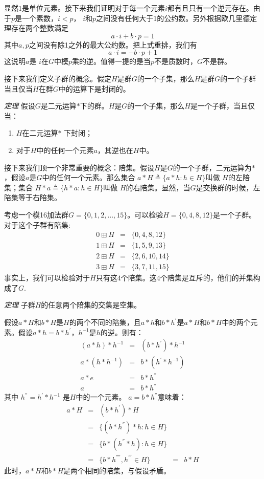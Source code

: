 \documentclass[10pt,a4paper,UTF8]{article}
\begin{document}
显然\(1\)是单位元素。接下来我们证明对于每一个元素\(i\)都有且只有一个逆元存在。由于\(p\)是一个素数，\(i < p\)， \(i\)和\(p\)之间没有任何大于1的公约数。另外根据欧几里德定理存在两个整数满足 \[a\cdot i + b\cdot p = 1\] 其中\(a,p\)之间没有除1之外的最大公约数。把上式重排，我们有 \[a\cdot i = -b\cdot p +1\] 这说明\(a\)是 \(i\)在\(G\)中模\(p\)乘的逆。值得一提的是当\(p\)不是质数时，\(G\)不是群。

接下来我们定义子群的概念。假定\(H\)是群\(G\)的一个子集，那么\(H\)是群\(G\)的一个子群当且仅当\(H\)在群\(G\)中的运算下是封闭的。

\emph{定理} 假设\(G\)是二元运算\(*\)下的群。\(H\)是\(G\)的一个子集，那么\(H\)是一个子群，当且仅当：
\begin{enumerate}
\item \(H\)在二元运算\(*\) 下封闭；
\item 对于\(H\)中的任何一个元素\(a\)，其逆也在\(H\)中。
\end{enumerate}

接下来我们顶一个非常重要的概念：陪集。假设\(H\)是\(G\)的一个子群，二元运算为\(*\)，假设\(a\)是\(G\)中的任何一个元素。那么集合 \(a*H \triangleq \{a*h: h\in H\}\)叫做 \(H\)的左陪集；集合 \(H*a \triangleq \{h*a: h\in H\}\)叫做 \(H\)的右陪集。显然，当\(G\)是交换群的时候，左陪集等于右陪集。

考虑一个模16加法群\(G = \{0,1,2,\ldots,15\}\)。可以检验\(H= \{0,4,8,12\}\)是一个子群。对于这个子群有陪集:
\begin{eqnarray*}
0\boxplus H &=& \{0,4,8,12\} \\
1\boxplus H &=& \{1,5,9,13\} \\
2\boxplus H &=& \{2,6,10,14\} \\
3\boxplus H &=& \{3,7,11,15\}
\end{eqnarray*}
事实上，我们可以检验对于\(H\)只有这\(4\)个陪集。这\(4\)个陪集是互斥的，他们的并集构成了\(G\).

\emph{定理} 子群\(H\)的任意两个陪集的交集是空集。

假设\(a*H\)和\(b*H\)是\(H\)的两个不同的陪集，且\(a*h\)和\(b*h^{'}\)是\(a*H\)和\(b*H\)中的两个元素。假设\(a*h = b*h^{'}\)，\(h^{-1}\)是\(h\)的逆。则有：
\begin{eqnarray*}
(a*h)*h^{-1}&=&(b*h^{'})*h^{-1} \\
a*(h*h^{-1})&=&b*(h^{'}*h^{-1}) \\
a*e &=& b* h^{''} \\
a &=& b*h^{''}
\end{eqnarray*}
其中 \(h^{''} = h^{'}*h^{-1}\) 是\(H\)中的一个元素。 \(a=b*h^{''}\)意味着：
\begin{eqnarray*}
a*H&=& (b*h^{'})*H \\
&=&\{(b*h^{''})*h:h\in H\} \\
&=&\{b*(h^{''}*h):h\in H\} \\
&=&\{b*h^{''''},h^{'''}\in H\}
&=& b*H
\end{eqnarray*}
此时，\(a*H\)和\(b*H\)是两个相同的陪集，与假设矛盾。
\end{document}
